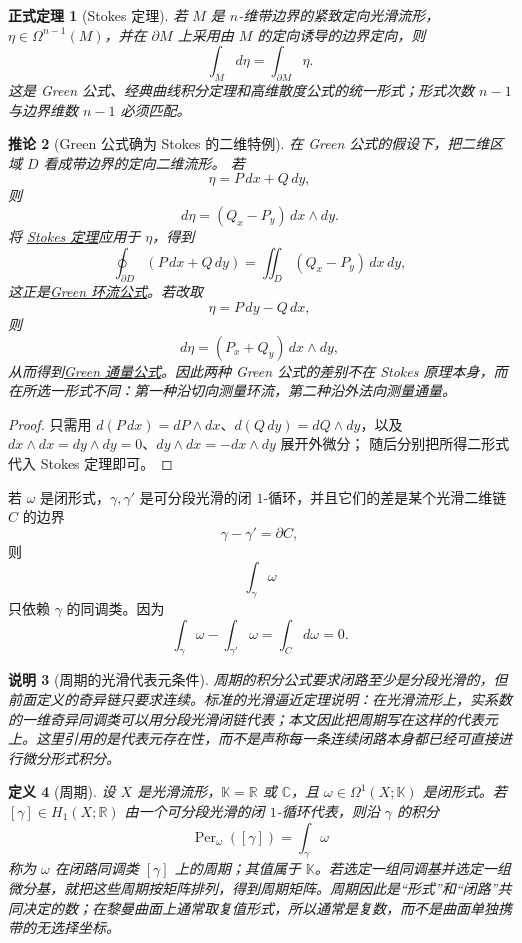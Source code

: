 \documentclass[UTF8,fontset=none,a4paper,11pt]{ctexart}
\theoremstyle{foundation-definition}
\newtheorem{definition}{定义}[section]
\theoremstyle{foundation-theorem}
\newtheorem{theorem}[definition]{正式定理}
\theoremstyle{foundation-proposition}
\theoremstyle{foundation-example}
\theoremstyle{foundation-remark}
\newtheorem{remark}[definition]{说明}
\theoremstyle{foundation-theorem}
\newtheorem{corollary}[definition]{推论}
\newcommand{\term}[2]{\hyperref[#1]{#2}}
\begin{document}
\begin{theorem}[Stokes 定理]\label{thm:stokes}
若 \(M\) 是 \(n\)-维带边界的紧致定向光滑流形，\(\eta\in\Omega^{n-1}(M)\)，并在 \(\partial M\) 上采用由 \(M\) 的定向诱导的边界定向，则
\[
\int_Md\eta=\int_{\partial M}\eta.
\]
这是 Green 公式、经典曲线积分定理和高维散度公式的统一形式；形式次数 \(n-1\) 与边界维数 \(n-1\) 必须匹配。
\end{theorem}

\begin{corollary}[Green 公式确为 Stokes 的二维特例]\label{cor:green-as-stokes}
在 Green 公式的假设下，把二维区域 \(D\) 看成带边界的定向二维流形。
若
\[
\eta=P\,dx+Q\,dy,
\]
则
\[
d\eta=(Q_x-P_y)\,dx\wedge dy.
\]
将 \term{thm:stokes}{Stokes 定理}应用于 \(\eta\)，得到
\[
\oint_{\partial D}(P\,dx+Q\,dy)
=\iint_D(Q_x-P_y)\,dx\,dy,
\]
这正是\term{thm:green-circulation}{Green 环流公式}。若改取
\[
\eta=P\,dy-Q\,dx,
\]
则
\[
d\eta=(P_x+Q_y)\,dx\wedge dy,
\]
从而得到\term{thm:green-flux}{Green 通量公式}。因此两种 Green 公式的差别不在
Stokes 原理本身，而在所选一形式不同：第一种沿切向测量环流，第二种沿外法向测量通量。
\end{corollary}

\begin{proof}
只需用 \(d(P\,dx)=dP\wedge dx\)、\(d(Q\,dy)=dQ\wedge dy\)，以及
\(dx\wedge dx=dy\wedge dy=0\)、\(dy\wedge dx=-dx\wedge dy\) 展开外微分；
随后分别把所得二形式代入 Stokes 定理即可。
\end{proof}

若 \(\omega\) 是闭形式，\(\gamma,\gamma'\) 是可分段光滑的闭 \(1\)-循环，并且它们的差是某个光滑二维链 \(C\) 的边界
\[
\gamma-\gamma'=\partial C,
\]
则
\[
\int_\gamma\omega
\]
只依赖 \(\gamma\) 的同调类。因为
\[
\int_\gamma\omega-\int_{\gamma'}\omega
=\int_Cd\omega=0.
\]

\begin{remark}[周期的光滑代表元条件]\label{rem:period-smooth-representatives}
周期的积分公式要求闭路至少是分段光滑的，但前面定义的奇异链只要求连续。标准的光滑逼近定理说明：在光滑流形上，实系数的一维奇异同调类可以用分段光滑闭链代表；本文因此把周期写在这样的代表元上。这里引用的是代表元存在性，而不是声称每一条连续闭路本身都已经可直接进行微分形式积分。
\end{remark}

\begin{definition}[周期]\label{def:period}
设 \(X\) 是光滑流形，\(\mathbb K=\mathbb R\) 或 \(\mathbb C\)，且
\(\omega\in\Omega^1(X;\mathbb K)\) 是闭形式。若
\([\gamma]\in H_1(X;\mathbb R)\) 由一个可分段光滑的闭 \(1\)-循环代表，则沿 \(\gamma\) 的积分
\[
\operatorname{Per}_{\omega}([\gamma])=\int_\gamma\omega
\]
称为 \(\omega\) 在闭路同调类 \([\gamma]\) 上的周期；其值属于 \(\mathbb K\)。若选定一组同调基并选定一组微分基，就把这些周期按矩阵排列，得到周期矩阵。周期因此是“形式”和“闭路”共同决定的数；在黎曼曲面上通常取复值形式，所以通常是复数，而不是曲面单独携带的无选择坐标。
\end{definition}
\end{document}
